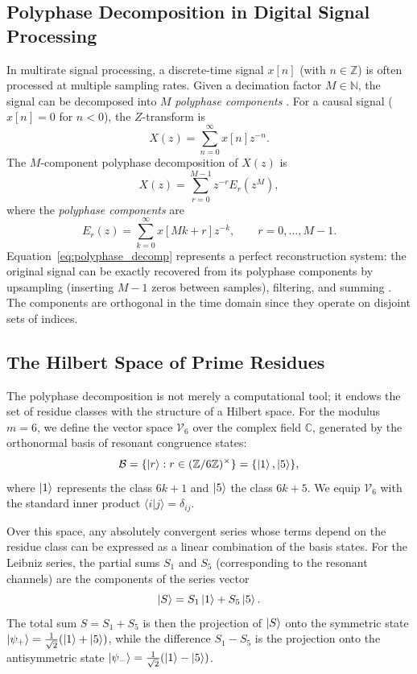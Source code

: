 \documentclass[12pt,a4paper]{article}
\theoremstyle{plain}
\theoremstyle{definition}
\theoremstyle{remark}
\begin{document}
\subsection{Polyphase Decomposition in Digital Signal Processing}
In multirate signal processing, a discrete-time signal \(x[n]\) (with \(n \in \mathbb{Z}\)) is often processed at multiple sampling rates. Given a decimation factor \(M \in \mathbb{N}\), the signal can be decomposed into \(M\) \emph{polyphase components} \cite{vaidyanathan}. For a causal signal (\(x[n] = 0\) for \(n < 0\)), the \(Z\)-transform is
\begin{equation}
X(z) = \sum_{n=0}^{\infty} x[n] z^{-n}.
\label{eq:ZT}
\end{equation}
The \(M\)-component polyphase decomposition of \(X(z)\) is
\begin{equation}
X(z) = \sum_{r=0}^{M-1} z^{-r} E_r(z^M),
\label{eq:polyphase_decomp}
\end{equation}
where the \emph{polyphase components} are
\begin{equation}
E_r(z) = \sum_{k=0}^{\infty} x[Mk + r] z^{-k}, \qquad r = 0, \dots, M-1.
\label{eq:Er}
\end{equation}
Equation~\eqref{eq:polyphase_decomp} represents a perfect reconstruction system: the original signal can be exactly recovered from its polyphase components by upsampling (inserting \(M-1\) zeros between samples), filtering, and summing \cite{vaidyanathan}. The components are orthogonal in the time domain since they operate on disjoint sets of indices.

\subsection{The Hilbert Space of Prime Residues}
The polyphase decomposition is not merely a computational tool; it endows the set of residue classes with the structure of a Hilbert space. For the modulus $m=6$, we define the vector space $\mathcal{V}_6$ over the complex field $\mathbb{C}$, generated by the orthonormal basis of resonant congruence states:
\begin{equation}
\mathcal{B} = \{ \ket{r} : r \in (\mathbb{Z}/6\mathbb{Z})^{\times} \} = \{ \ket{1}, \ket{5} \},
\end{equation}
where $\ket{1}$ represents the class $6k+1$ and $\ket{5}$ the class $6k+5$. We equip $\mathcal{V}_6$ with the standard inner product $\langle i | j \rangle = \delta_{ij}$.

Over this space, any absolutely convergent series whose terms depend on the residue class can be expressed as a linear combination of the basis states. For the Leibniz series, the partial sums $S_1$ and $S_5$ (corresponding to the resonant channels) are the components of the series vector
\begin{equation}
\ket{S} = S_1 \ket{1} + S_5 \ket{5}.
\end{equation}
The total sum $S = S_1 + S_5$ is then the projection of $\ket{S}$ onto the symmetric state $\ket{\psi_+} = \frac{1}{\sqrt{2}}(\ket{1} + \ket{5})$, while the difference $S_1 - S_5$ is the projection onto the antisymmetric state $\ket{\psi_-} = \frac{1}{\sqrt{2}}(\ket{1} - \ket{5})$.
\end{document}

